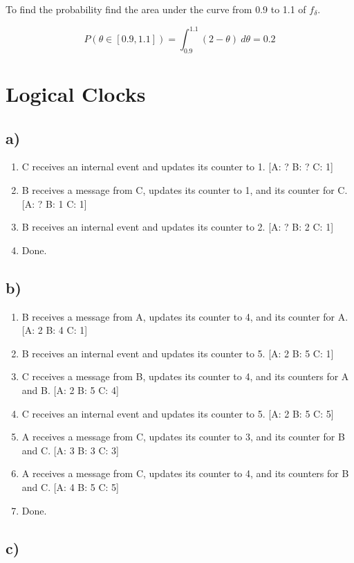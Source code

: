\documentclass[12pt]{article}
\begin{document}
To find the probability find the area under the curve from 0.9 to 1.1 of $f_\delta$.

\[P(\theta \in \left[ 0.9, 1.1 \right]) = \int^{1.1}_{0.9} (2 - \theta) \ d\theta = 0.2\]

\section{Logical Clocks}
\subsection*{a)}
\begin{enumerate}
\item C receives an internal event and updates its counter to 1. [A: ? B: ? C: 1]
\item B receives a message from C, updates its counter to 1, and its counter for C. [A: ? B: 1 C: 1]
\item B receives an internal event and updates its counter to 2. [A: ? B: 2 C: 1]
\item Done.
\end{enumerate}
\subsection*{b)}

\begin{enumerate}
\item B receives a message from A, updates its counter to 4, and its counter for A.
[A: 2 B: 4 C: 1]
\item B receives an internal event and updates its counter to 5. [A: 2 B: 5 C: 1]
\item C receives a message from B, updates its counter to 4, and its counters for A and B. [A: 2 B: 5 C: 4]
\item C receives an internal event and updates its counter to 5. [A: 2 B: 5 C: 5]
\item A receives a message from C, updates its counter to 3, and its counter for B and C. [A: 3 B: 3 C: 3]
\item A receives a message from C, updates its counter to 4, and its counters for B and C. [A: 4 B: 5 C: 5]
\item Done.
\end{enumerate}
\subsection*{c)}
\end{document}
